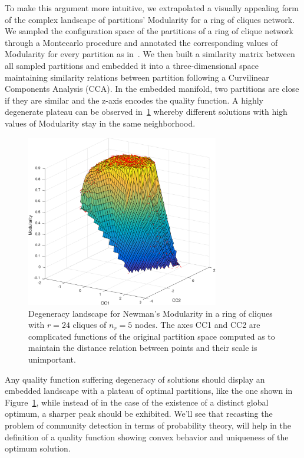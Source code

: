 To make this argument more intuitive, we extrapolated a visually appealing form of the complex landscape of partitions' Modularity for a ring of cliques network. We sampled the configuration space of the partitions of a ring of clique network through a Montecarlo procedure and annotated the corresponding values of Modularity for every partition as in~\cite{good2009}.
We then built a similarity matrix between all sampled partitions and embedded it into a three-dimensional space maintaining similarity relations between partition following a Curvilinear Components Analysis (CCA).
In the embedded manifold, two partitions are close if they are similar and the z-axis encodes the quality function.
A highly degenerate plateau can be observed in~\ref{fig:degeneracylandscape} whereby different solutions with high values of Modularity stay in the same neighborhood.

\begin{figure}[htb!]
\centering
\includegraphics[width=0.75\textwidth]{images/degeneracy_modularity.pdf}
\caption{Degeneracy landscape for Newman's Modularity in a ring of cliques with $r=24$ cliques of $n_r=5$ nodes. The axes CC1 and CC2 are complicated functions of the original partition space computed as to maintain the distance relation between points and their scale is unimportant.}
\label{fig:degeneracylandscape}
\end{figure}

Any quality function suffering degeneracy of solutions should display an embedded landscape with a plateau of optimal partitions, like the one shown in Figure~\ref{fig:degeneracylandscape}, while instead of in the case of the existence of a distinct global optimum, a sharper peak should be exhibited.
We'll see that recasting the problem of community detection in terms of probability theory, will help in the definition of a quality function showing convex behavior and uniqueness of the optimum solution.

